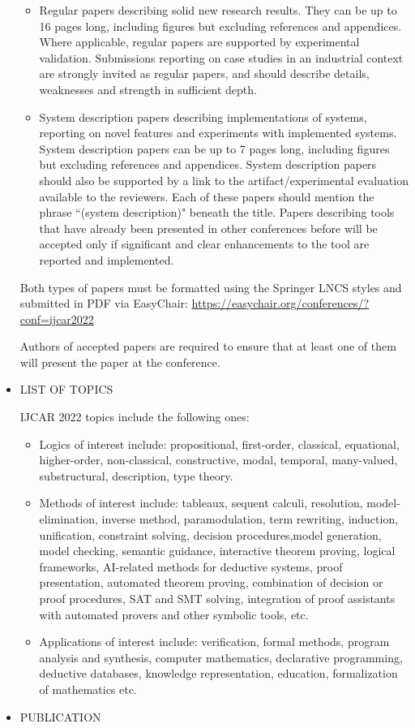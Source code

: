\documentclass[prodmode,acmtecs]{acmsmall} %
\begin{document}
\begin{itemize}
\begin{itemize}\item  Regular papers describing solid new research results. They can be up to 16 pages long, including figures but excluding references and appendices. Where applicable, regular papers are supported by experimental validation. Submissions reporting on case studies in an industrial context are strongly invited as regular papers, and should describe details, weaknesses and strength in sufficient depth.
\item  System description papers describing implementations of systems, reporting on novel features and experiments with implemented systems. System description papers can be up to 7 pages long, including figures but excluding references and appendices. System description papers should also be supported by a link to the artifact/experimental evaluation available to the reviewers. Each of these papers should mention the phrase ``(system description)" beneath the title. Papers describing tools that have already been presented in other conferences before will be accepted only if significant and clear enhancements to the tool are reported and implemented.
\end{itemize} 
  Both types of papers must be formatted using the Springer LNCS styles and submitted in PDF via EasyChair: \href{https://easychair.org/conferences/?conf=ijcar2022}{https://easychair.org/conferences/?conf=ijcar2022} 
 
  Authors of accepted papers are required to ensure that at least one of them will present the paper at the conference. 
 
\item  LIST OF TOPICS  
 
  IJCAR 2022 topics include the following ones: 
 
\begin{itemize}\item  Logics of interest include: propositional, first-order, classical, equational, higher-order, non-classical, constructive, modal, temporal, many-valued, substructural, description, type theory.
\item  Methods of interest include: tableaux, sequent calculi, resolution, model- elimination, inverse method, paramodulation, term rewriting, induction, unification, constraint solving, decision procedures,model generation, model checking, semantic guidance, interactive theorem proving, logical frameworks, AI-related methods for deductive systems, proof presentation, automated theorem proving, combination of decision or proof procedures, SAT and SMT solving, integration of proof assistants with automated provers and other symbolic tools, etc.
\item  Applications of interest include: verification, formal methods, program analysis and synthesis, computer mathematics, declarative programming, deductive databases, knowledge representation, education, formalization of mathematics etc.
\end{itemize} 
\item  PUBLICATION 
 

\end{itemize}
\end{document}
